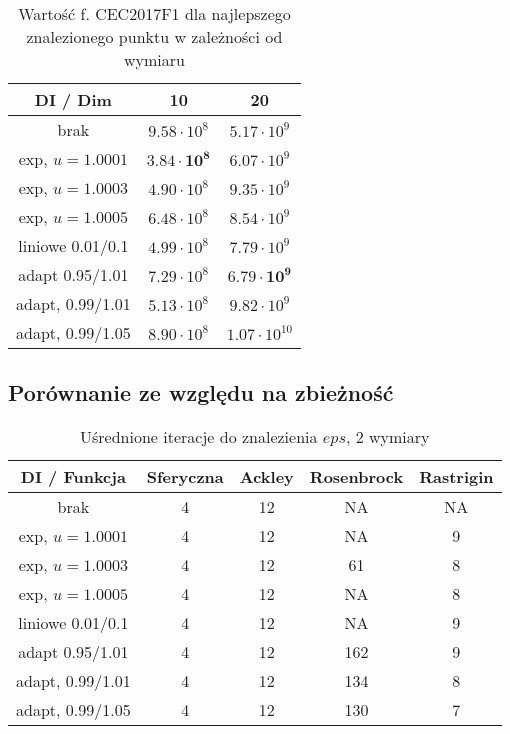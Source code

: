 \documentclass[12pt]{article}
\begin{document}
\begin{table}[ht]
	\centering
	\begin{tabular}{|c|c|c|}
		\hline
		DI / Dim         & 10                         & 20                         \\
		\hline
		brak             & $9.58 \cdot 10^8$          & $5.17 \cdot 10^9$          \\
		exp, $u=1.0001$  & $\mathbf{3.84 \cdot 10^8}$ & $6.07 \cdot 10^9$          \\
		exp, $u=1.0003$  & $4.90 \cdot 10^8$          & $9.35 \cdot 10^9$          \\
		exp, $u=1.0005$  & $6.48 \cdot 10^8$          & $8.54 \cdot 10^9$          \\
		liniowe 0.01/0.1 & $4.99 \cdot 10^8$          & $7.79 \cdot 10^9$          \\
		adapt 0.95/1.01  & $7.29 \cdot 10^8$          & $\mathbf{6.79 \cdot 10^9}$ \\
		adapt, 0.99/1.01 & $5.13 \cdot 10^8$          & $9.82 \cdot 10^9$          \\
		adapt, 0.99/1.05 & $8.90 \cdot 10^8$          & $1.07 \cdot 10^{10}$       \\
		\hline
	\end{tabular}
	\caption{Wartość f. CEC2017F1 dla najlepszego znalezionego punktu w zależności od wymiaru}
	\label{tab:2017_comp}
\end{table}

\pagebreak
\subsection*{Porównanie ze względu na zbieżność}

\begin{table}[h]
	\centering
	\begin{tabular}{|c|c|c|c|c|}
		\hline
		DI / Funkcja     & Sferyczna & Ackley & Rosenbrock & Rastrigin \\
		\hline
		brak             & 4         & 12     & NA         & NA        \\
		exp, $u=1.0001$  & 4         & 12     & NA         & 9         \\
		exp, $u=1.0003$  & 4         & 12     & 61         & 8         \\
		exp, $u=1.0005$  & 4         & 12     & NA         & 8         \\
		liniowe 0.01/0.1 & 4         & 12     & NA         & 9         \\
		adapt 0.95/1.01  & 4         & 12     & 162        & 9         \\
		adapt, 0.99/1.01 & 4         & 12     & 134        & 8         \\
		adapt, 0.99/1.05 & 4         & 12     & 130        & 7         \\
		\hline
	\end{tabular}
	\caption{Uśrednione iteracje do znalezienia $eps$, 2 wymiary}
	\label{convergence_table}
\end{table}
\end{document}
